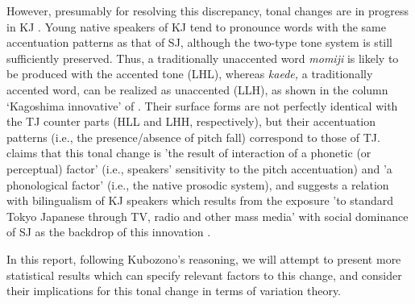 \documentclass[output=paper]{LSP/langsci}
\begin{document}
However, presumably for resolving this discrepancy, tonal changes are in progress in KJ \citep{kubozono_tonal_2007}. Young native speakers of KJ tend to pronounce words with the same accentuation patterns as that of SJ, although the two-type tone system is still sufficiently preserved. Thus, a traditionally unaccented word \textit{momiji }is likely to be produced with the accented tone (LHL), whereas \textit{kaede,} a traditionally accented word, can be realized as unaccented (LLH), as shown in the column ‘Kagoshima innovative’ of . Their surface forms are not perfectly identical with the TJ counter parts (HLL and LHH, respectively), but their accentuation patterns (i.e., the presence/absence of pitch fall) correspond to those of TJ. \citet[348]{kubozono_tonal_2007} claims that this tonal change is 'the result of interaction of a phonetic (or perceptual) factor' (i.e., speakers' sensitivity to the pitch accentuation) and 'a phonological factor' (i.e., the native prosodic system), and suggests a relation with bilingualism of KJ speakers which results from the exposure 'to standard Tokyo Japanese through TV, radio and other mass media' with social dominance of SJ as the backdrop of this innovation \citep[323]{kubozono_tonal_2007}.
 
\begin{table} 
\caption{Surface tone and accentuation in SJ, Traditional KJ and Innovative KJ}
\label{tab:2}
\end{table}

In this report, following Kubozono’s reasoning, we will attempt to present more statistical results which can specify relevant factors to this change, and consider their implications for this tonal change in terms of variation theory.
\end{document}
